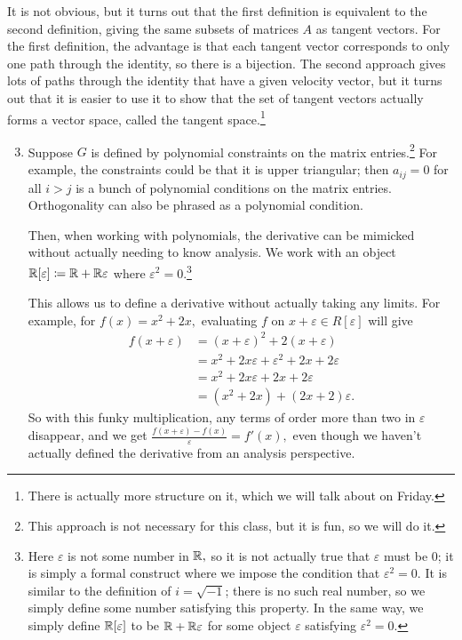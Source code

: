 It is not obvious, but it turns out that the first definition is equivalent to the second definition, giving the same subsets of matrices $A$ as tangent vectors. For the first definition, the advantage is that each tangent vector corresponds to only one path through the identity, so there is a bijection. The second approach gives lots of paths through the identity that have a given velocity vector, but it turns out that it is easier to use it to show that the set of tangent vectors actually forms a vector space, called the tangent space.\footnote{There is actually more structure on it, which we will talk about on Friday.}

\begin{enumerate} %
\setcounter{enumi}{2}
    \item Suppose $G$ is defined by polynomial constraints on the matrix entries.\footnote{This approach is not necessary for this class, but it is fun, so we will do it.} For example, the constraints could be that it is upper triangular; then $a_{ij} = 0$ for all $i > j$ is a bunch of polynomial conditions on the matrix entries. Orthogonality can also be phrased as a polynomial condition.
    
    Then, when working with polynomials, the derivative can be mimicked without actually needing to know analysis. We work with an object $\mathbb R[\varepsilon] \coloneqq \mathbb R + \mathbb R \varepsilon$ where $\varepsilon^2 = 0.$\footnote{Here $\varepsilon$ is not some number in $\mathbb R,$ so it is not actually true that $\varepsilon$ must be 0; it is simply a formal construct where we impose the condition that $\varepsilon^2 = 0.$ It is similar to the definition of $i = \sqrt{-1}$; there is no such real number, so we simply define some number satisfying this property. In the same way, we simply define $\mathbb R[\varepsilon]$ to be $\mathbb R + \mathbb R \varepsilon$ for some object $\varepsilon$ satisfying $\varepsilon^2 = 0.$} 
    
    This allows us to define a derivative without actually taking any limits. For example, for $f(x)  = x^2 + 2x,$ evaluating $f$ on $x + \varepsilon \in R[\varepsilon]$ will give
    \begin{align*}
           f(x + \varepsilon) &= (x + \varepsilon)^2 + 2(x + \varepsilon) \\
           &= x^2 + 2x\varepsilon + \varepsilon^2 + 2x + 2\varepsilon\\
           &= x^2 + 2x\varepsilon + 2x + 2\varepsilon\\
           &= (x^2 + 2x) + (2x + 2)\varepsilon.
    \end{align*}
    So with this funky multiplication, any terms of order more than two in $\varepsilon$ disappear, and we get $\frac{f(x + \varepsilon) - f(x)}{\varepsilon} = f'(x),$ even though we haven't actually defined the derivative from an analysis perspective. 
\end{enumerate}

